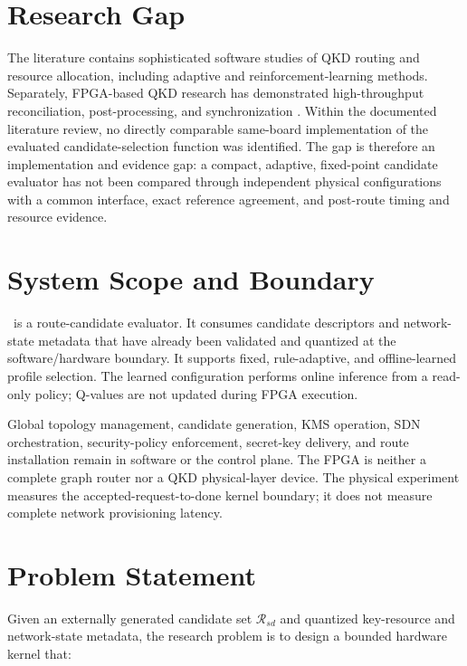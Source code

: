 \section{Research Gap}

The literature contains sophisticated software studies of QKD routing and resource
allocation, including adaptive and reinforcement-learning methods. Separately,
FPGA-based QKD research has demonstrated high-throughput reconciliation,
post-processing, and synchronization
\cite{lu2023multidimensional,venkatachalam2023postprocessing,liao2025polar,
chandra2025synchronization}. Within the documented literature review, no directly
comparable same-board implementation of the evaluated candidate-selection function
was identified. The gap is therefore an implementation and evidence gap: a compact,
adaptive, fixed-point candidate evaluator has not been compared through independent
physical configurations with a common interface, exact reference agreement, and
post-route timing and resource evidence.

\section{System Scope and Boundary}

\QFlow\ is a route-candidate evaluator. It consumes candidate descriptors and
network-state metadata that have already been validated and quantized at the
software/hardware boundary. It supports fixed, rule-adaptive, and offline-learned
profile selection. The learned configuration performs online inference from a
read-only policy; Q-values are not updated during FPGA execution.

Global topology management, candidate generation, KMS operation, SDN orchestration,
security-policy enforcement, secret-key delivery, and route installation remain in
software or the control plane. The FPGA is neither a complete graph router nor a QKD
physical-layer device. The physical experiment measures the accepted-request-to-done
kernel boundary; it does not measure complete network provisioning latency.

\section{Problem Statement}

Given an externally generated candidate set $\mathcal{R}_{sd}$ and quantized
key-resource and network-state metadata, the research problem is to design a bounded
hardware kernel that:


